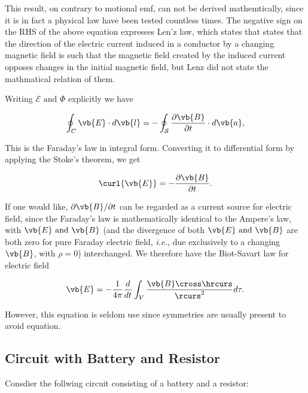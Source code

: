 \documentclass[english,a4paper,12pt]{report}
\begin{document}
This result, on contrary to motional emf, can not be derived mathemtically, since it is in fact a physical law have been tested countless times. The negative sign on the RHS of the above equation expresses Len'z law, which states that states that the direction of the electric current induced in a conductor by a changing magnetic field is such that the magnetic field created by the induced current opposes changes in the initial magnetic field, but Lenz did not state the mathmatical relation of them. 

Writing \(\mathcal{E}\text { and } \Phi \) explicitly we have

\begin{equation}
    \oint_{C}\vb{E}  \cdot d \vb{l} = -\oint_{\mathcal{S}} \frac{\partial \vb{B} }{\partial t}\cdot d \vb{a} ,  
\end{equation}

This is the Faraday's law in integral form. Converting it to differential form by applying the Stoke's theorem, we get

\begin{equation}
    \curl{\vb{E} } = -\frac{\partial \vb{B} }{\partial t}.  
\end{equation}

If one would like, \(\partial \vb{B} /\partial t\) can be regarded as a current source for electric field, since the Faraday's law is mathematically identical to the Ampere's law, with \(\vb{E} \text { and } \vb{B} \) (and the divergence of both \(\vb{E} \text { and } \vb{B} \) are both zero for pure Faraday electric field, \textit{i.e.,} due exclusively to a changing \(\vb{B} \), with \(\rho =0\)) interchanged. We therefore have the Biot-Savart law for electric field 

\begin{equation}
    \vb{E} = -\frac{1}{4\pi } \frac{d}{dt} \int_{V}^{} \frac{\vb{B} \cross \hrcurs }{\rcurs ^2} d\tau .  
\end{equation}

However, this equation is seldom use since symmetries are usually present to avoid equation.




\subsection{Circuit with Battery and Resistor}

Consdier the follwing circuit consisting of a battery and a resistor:
\end{document}
